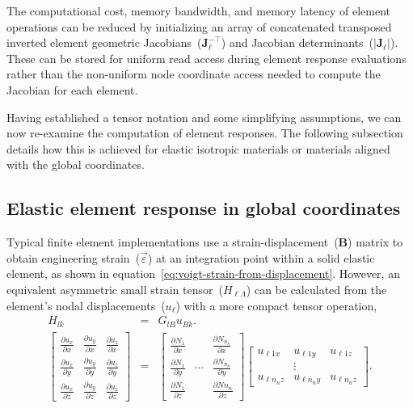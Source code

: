 \documentclass[]             %
{NASA}                       %
\begin{document}
The computational cost, memory bandwidth, and memory latency of element
 operations can be reduced by initializing an array of concatenated transposed inverted element geometric 
 Jacobians~($\mathbf{J}_{\ell}^{-\top}$) and Jacobian determinants~($|\mathbf{J}_{\ell}|$).
 These can be stored for uniform read access during element response
 evaluations rather than the non-uniform node coordinate access needed to compute the Jacobian for each element.

Having established a tensor notation and some simplifying assumptions, we can now re-examine the computation of element responses. The following subsection details how this is achieved for elastic isotropic materials or materials aligned with the global coordinates.

\subsection{Elastic element response in global coordinates}
\label{subsec:EBE-tensor-train-iso}

Typical finite element implementations use a strain-displacement~($\mathbf{B}$)
matrix to obtain engineering strain~($\vec{\varepsilon}$) at an integration point
within a solid elastic element, as shown in equation~\ref{eq:voigt-strain-from-displacement}.
However, an equivalent asymmetric small strain tensor~($H_{\ell\Lambda}$)
can be calculated from the element's nodal displacements~($u_{\ell}$)
with a more compact tensor operation,
\begin{eqnarray}
H_{lk} & = & G_{lB}u_{Bk}\text{.}\label{eq:tensor-strain-from-displacement}\\
\left[\begin{array}{ccc}
\frac{\partial u_{x}}{\partial x} & \frac{\partial u_{y}}{\partial x} & \frac{\partial u_{z}}{\partial x}\\
\frac{\partial u_{x}}{\partial y} & \frac{\partial u_{y}}{\partial y} & \frac{\partial u_{z}}{\partial y}\\
\frac{\partial u_{x}}{\partial z} & \frac{\partial u_{y}}{\partial z} & \frac{\partial u_{z}}{\partial z}
\end{array}\right] & = & \left[\begin{array}{ccc}
\frac{\partial N_{1}}{\partial x} &  & \frac{\partial N_{n_{n}}}{\partial x}\\
\frac{\partial N_{1}}{\partial y} & \cdots & \frac{\partial N_{n_{n}}}{\partial y}\\
\frac{\partial N_{1}}{\partial z} &  & \frac{\partial Nn_{n}}{\partial z}
\end{array}\right]\left[\begin{array}{ccc}
u_{\ell1x} & u_{\ell1y} & u_{\ell1z}\\
 & \vdots\\
u_{\ell n_{n}z} & u_{\ell n_{n}y} & u_{\ell n_{n}z}
\end{array}\right]\text{.}\nonumber 
\end{eqnarray}
\end{document}
